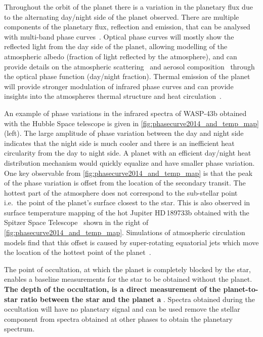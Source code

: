 Throughout the orbit of the planet there is a variation in the planetary flux due to the alternating day/night side of the planet observed.
There are multiple components of the planetary flux, reflection and emission, that can be analysed with multi-band phase curves~\citep[e.g.][]{knutson_characterizing_2009, esteves_optical_2013}.
Optical phase curves will mostly show the reflected light from the day side of the planet, allowing modelling of the atmospheric albedo (fraction of light reflected by the atmosphere), and can provide details on the atmospheric scattering~\citep{madhusudhan_analytic_2012} and aerosol composition~\citep{oreshenko_optical_2016} through the optical phase function (day/night fraction).
Thermal emission of the planet will provide stronger modulation of infrared phase curves and can provide insights into the atmospheres thermal
structure and heat circulation~\citep{goodman_thermodynamics_2009, koll_temperature_2016}.

An example of phase variations in the infrared spectra of {WASP-43b} obtained with the Hubble Space telescope is given in \cref{fig:phasecurve2014_and_temp_map} (left).
The large amplitude of phase variation between the day and night side indicates that the night side is much cooler and there is an inefficient heat circularity from the day to night side.
A planet with an efficient day/night heat distribution mechanism would quickly equalize and have smaller phase variation.
One key observable from \cref{fig:phasecurve2014_and_temp_map} is that the peak of the phase variation is offset from the location of the secondary transit.
The hottest part of the atmosphere does not correspond to the sub-stellar point i.e.\ the point of the planet's surface closest to the star.
This is also observed in surface temperature mapping of the hot Jupiter HD\,189733b obtained with the {Spitzer Space Telescope}~\citep{knutson_map_2007} shown in the right of \cref{fig:phasecurve2014_and_temp_map}.
Simulations of atmospheric circulation models find that this offset is caused by super-rotating equatorial jets which move the location of the hottest point of the planet~\citep[e.g.][and references therein]{heng_atmospheric_2015}.

The point of occultation, at which the planet is completely blocked by the star, enables a baseline measurements for the star to be obtained without the planet.
\textbf{The depth of the occultation, is a direct measurement of the planet-to-star ratio between the star and the planet a }.
Spectra obtained during the occultation will have no planetary signal and can be used remove the stellar component from spectra obtained at other phases to obtain the planetary spectrum.


